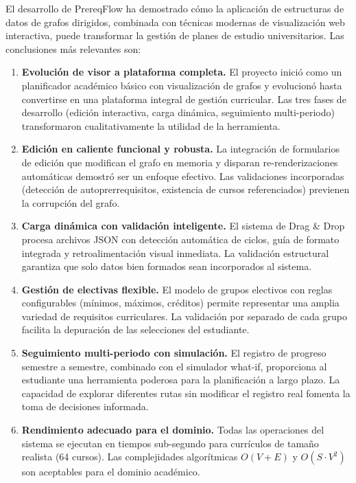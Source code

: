 \documentclass[12pt]{report}
\begin{document}
El desarrollo de PrereqFlow ha demostrado cómo la aplicación de estructuras de datos de grafos dirigidos, combinada con técnicas modernas de visualización web interactiva, puede transformar la gestión de planes de estudio universitarios. Las conclusiones más relevantes son:

\begin{enumerate}
    \item \textbf{Evolución de visor a plataforma completa.} El proyecto inició como un planificador académico básico con visualización de grafos y evolucionó hasta convertirse en una plataforma integral de gestión curricular. Las tres fases de desarrollo (edición interactiva, carga dinámica, seguimiento multi-periodo) transformaron cualitativamente la utilidad de la herramienta.

    \item \textbf{Edición en caliente funcional y robusta.} La integración de formularios de edición que modifican el grafo en memoria y disparan re-renderizaciones automáticas demostró ser un enfoque efectivo. Las validaciones incorporadas (detección de autoprerrequisitos, existencia de cursos referenciados) previenen la corrupción del grafo.

    \item \textbf{Carga dinámica con validación inteligente.} El sistema de Drag \& Drop procesa archivos JSON con detección automática de ciclos, guía de formato integrada y retroalimentación visual inmediata. La validación estructural garantiza que solo datos bien formados sean incorporados al sistema.

    \item \textbf{Gestión de electivas flexible.} El modelo de grupos electivos con reglas configurables (mínimos, máximos, créditos) permite representar una amplia variedad de requisitos curriculares. La validación por separado de cada grupo facilita la depuración de las selecciones del estudiante.

    \item \textbf{Seguimiento multi-periodo con simulación.} El registro de progreso semestre a semestre, combinado con el simulador what-if, proporciona al estudiante una herramienta poderosa para la planificación a largo plazo. La capacidad de explorar diferentes rutas sin modificar el registro real fomenta la toma de decisiones informada.

    \item \textbf{Rendimiento adecuado para el dominio.} Todas las operaciones del sistema se ejecutan en tiempos sub-segundo para currículos de tamaño realista (64 cursos). Las complejidades algorítmicas $O(V+E)$ y $O(S \cdot V^2)$ son aceptables para el dominio académico.


\end{enumerate}
\end{document}

